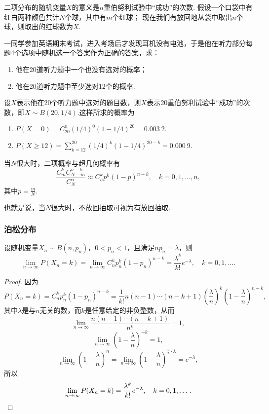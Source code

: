 二项分布的随机变量\(X\)的意义是\(n\)重伯努利试验中“成功”的次数.
假设一个口袋中有红白两种颜色共计\(N\)个球，其中有\(m\)个红球；
现在我们有放回地从袋中取出\(n\)个球，则取出的红球数为\(X\).

\begin{example}
一同学参加英语期末考试，进入考场后才发现耳机没有电池，于是他在听力部分每题4个选项中随机选一个答案作为正确的答案，求：\begin{enumerate}
\item 他在20道听力题中一个也没有选对的概率；
\item 他在20道听力题中至少选对12个的概率.
\end{enumerate}
\begin{solution}
设\(X\)表示他在20个听力题中选对的题目数，则\(X\)表示20重伯努利试验中“成功”的次数，即\(X \sim B(20, 1/4)\).这样所求的概率为\begin{enumerate}
\item \(P(X=0) = C_{20}^0 (1/4)^0 (1-1/4)^{20} = 0.003\ 2\).
\item \(P(X \geqslant 12) = \sum\limits_{k=12}^{20} (1/4)^k (1-1/4)^{20-k} = 0.000\ 9\).
\end{enumerate}
\end{solution}
\end{example}

\begin{theorem}
当\(N\)很大时，二项概率与超几何概率有\[
\frac{C_m^k C_{N-m}^{n-k}}{C_N^n} \approx C_n^k p^k (1-p)^{n-k}, \quad k=0,1,\dotsc,n,
\]其中\(p=\frac{m}{N}\).

也就是说，当\(N\)很大时，不放回抽取可视为有放回抽取.
\end{theorem}

\subsubsection{泊松分布}
\begin{theorem}[泊松定理]
设随机变量\(X_n \sim B(n,p_n)\)，\(0 < p_n < 1\)，且满足\(n p_n = \lambda\)，则\begin{equation}
\lim\limits_{n\to\infty} P(X_n=k)
= \lim\limits_{n\to\infty} C_n^k p_n^k (1-p_n)^{n-k}
= \frac{\lambda^k}{k!} e^{-\lambda},
\quad k=0,1,\dotsc.
\end{equation}
\begin{proof}
因为\[
P(X_n=k) = C_n^k p_n^k (1-p_n)^{n-k}
= \frac{1}{k!} n(n-1)\dotsm(n-k+1) \left(\frac{\lambda}{n}\right)^k \left(1-\frac{\lambda}{n}\right)^{n-k},
\]其中\(\lambda\)是与\(n\)无关的数，而\(k\)是任意给定的非负整数，从而\[
\lim\limits_{n\to\infty} \frac{n(n-1)\dotsm(n-k+1)}{n^k} = 1,
\]\[
\lim\limits_{n\to\infty} \left(1-\frac{\lambda}{n}\right)^{-k} = 1,
\]\[
\lim\limits_{n\to\infty} \left(1-\frac{\lambda}{n}\right)^n
= \lim\limits_{n\to\infty} \left(1-\frac{\lambda}{n}\right)^{\frac{n}{\lambda} \cdot \lambda} = e^{-\lambda},
\]所以\[
\lim\limits_{n\to\infty} P(X_n=k)
= \frac{\lambda^k}{k!} e^{-\lambda},
\quad k=0,1,\dotsc.
\qedhere
\]
\end{proof}
\end{theorem}

